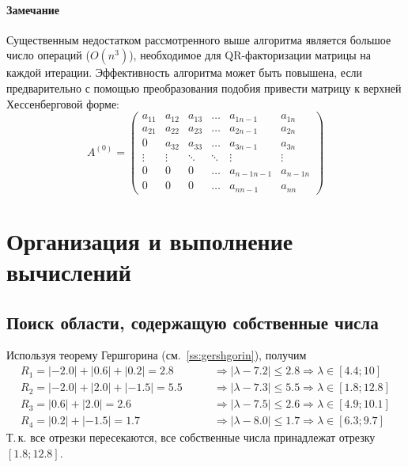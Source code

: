 \documentclass[a4paper,12pt,notitlepage,pdftex,headsepline]{scrartcl}
\begin{document}
\paragraph{Замечание}
Существенным недостатком рассмотренного выше алгоритма является большое число операций ($O(n^3)$), необходимое для QR-факторизации матрицы на каждой итерации.
Эффективность алгоритма может быть повышена, если предварительно с помощью преобразования подобия привести матрицу к верхней Хессенберговой форме:
$$
A^{\left(0\right)} = \left(\begin{matrix}
a_{11} & a_{12} & a_{13} & \hdots & a_{1 n-1} & a_{1n}\\
a_{21} & a_{22} & a_{23} & \hdots & a_{2 n-1} & a_{2n}\\
0 & 	a_{32} & a_{33} & \hdots & a_{3 n-1} & a_{3n}\\
\vdots & \vdots & \ddots & \ddots & \vdots & \vdots\\
0 & 0 & 0 & \hdots & a_{n-1 n-1} & a_{n-1 n}\\
0 & 0 & 0 & \hdots & a_{n n-1} & a_{nn} 
\end{matrix}\right)$$
\newpage
\section{Организация и выполнение вычислений}
\subsection{Поиск области, содержащую собственные числа}
Используя теорему Гершгорина (см.~\ref{ss:gershgorin}), получим
\[
\begin{aligned}
R_1 = \left|-2.0\right|+\left|0.6\right|+\left|0.2\right| = 2.8\qquad &\Rightarrow \left|\lambda - 7.2\right| \leqslant 2.8 \Rightarrow \lambda\in\left[4.4; 10\right]\\
R_2 = \left|-2.0\right|+\left|2.0\right|+\left|-1.5\right| = 5.5\qquad &\Rightarrow \left|\lambda - 7.3\right|\leqslant 5.5 \Rightarrow \lambda\in\left[1.8; 12.8\right]\\
R_3 = \left|0.6\right|+\left|2.0\right|=2.6\qquad &\Rightarrow \left|\lambda - 7.5\right|\leqslant 2.6 \Rightarrow \lambda\in\left[4.9; 10.1\right]\\
R_4 = \left|0.2\right|+\left|-1.5\right| = 1.7\qquad &\Rightarrow \left|\lambda - 8.0\right|\leqslant 1.7 \Rightarrow \lambda\in\left[6.3; 9.7\right]
\end{aligned}
\]
Т.\,к. все отрезки пересекаются, все собственные числа принадлежат отрезку $\left[1.8; 12.8\right]$.\
\end{document}
